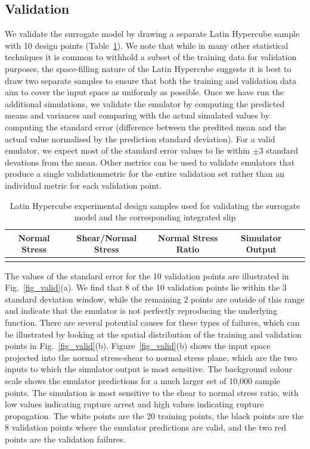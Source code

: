 \documentclass[openacc]{rstransa}%
\begin{document}
\subsection{Validation}

We validate the surrogate model by drawing a separate Latin Hypercube sample
with 10 design points (Table~\ref{table_valid}).
We note that while in many other statistical
techniques it is common to withhold a subset of the training data for
validation purposes, the space-filling nature of the Latin Hypercube suggests
it is best to draw two separate samples to ensure that both the training
and validation data aim to cover the input space as uniformly as possible.
Once we have run the additional simulations, we validate the emulator by
computing the predicted means and variances and comparing with the
actual simulated values by computing the standard error (difference
between the predited mean and the actual value normalised by the prediction
standard deviation). For a valid emulator, we expect most of the standard
error values to lie within $\pm 3$ standard devations from the mean.
Other metrics can be used to validate emulators \cite{validation} that
produce a single validationmetric for the entire validation set rather than an
individual metric for each validation point.

\begin{table}[!h]
\caption{Latin Hypercube experimental design samples used for validating the surrogate model and the
corresponding integrated slip}
\label{table_valid}
\begin{tabular}{ccccc}%
\hline
Normal Stress & Shear/Normal Stress & Normal Stress Ratio & Simulator Output \\
\hline

\\\hline
\end{tabular}
\vspace*{-4pt}
\end{table}%

The values of the standard error for the 10 validation points are illustrated
in Fig.~\ref{fig_valid}(a). We find that 8 of the 10 validation points lie
within the 3 standard deviation window, while the remaining 2 points are
outside of this range and indicate that the emulator is not perfectly
reproducing the underlying function. There are several potential causes
for these types of failures, which can be illustrated by looking at the
spatial distribution of the training and validation points in
Fig.~\ref{fig_valid}(b). Figure~\ref{fig_valid}(b) shows the input space
projected into the normal stress-shear to normal stress plane, which
are the two inputs to which the simulator output is most sensitive.
The background colour scale shows the emulator predictions for a much
larger set
of 10,000 sample points. The simulation is most sensitive to the shear to
normal stress ratio, with low values indicating rupture arrest and high
values indicating rupture propagation. The white points are the 20 training
points, the black points are the 8 validation points where the emulator
predictions are valid, and the two red points are the validation failures.
\end{document}
